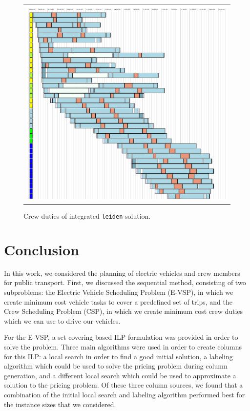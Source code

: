 \documentclass[]{article}
\begin{document}
\begin{figure}[!ht]
  \centering
  \begin{tabular}{@{}c@{}}
    \includegraphics[width=\textwidth]{images/leiden-crew.png}
  \end{tabular}
  \caption{Crew duties of integrated \texttt{leiden} solution.}
  \label{fig:leiden-int-solution-cr}
\end{figure}

\pagebreak

\section{Conclusion}
In this work, we considered the planning of electric vehicles and crew members for public transport. First, we discussed the sequential method, consisting of two subproblems: the Electric Vehicle Scheduling Problem (E-VSP), in which we create minimum cost vehicle tasks to cover a predefined set of trips, and the Crew Scheduling Problem (CSP), in which we create minimum cost crew duties which we can use to drive our vehicles. 

For the E-VSP, a set covering based ILP formulation was provided in order to solve the problem. Three main algorithms were used in order to create columns for this ILP: a local search in order to find a good initial solution, a labeling algorithm which could be used to solve the pricing problem during column generation, and a different local search which could be used to approximate a solution to the pricing problem. Of these three column sources, we found that a combination of the initial local search and labeling algorithm performed best for the instance sizes that we considered. 
\end{document}
